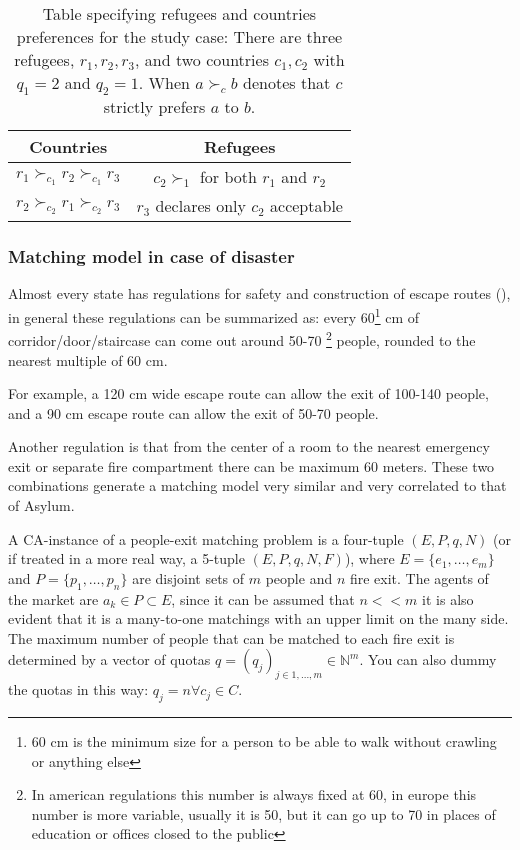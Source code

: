 \documentclass[letterpaper]{article} %
\begin{document}
\begin{table}[!htb]
    \begin{tabular}{c|c}
        \hline Countries & Refugees \\
        \hline\( r_{1} \succ_{c_{1}} r_{2} \succ_{c_{1}} r_{3} \) & \( c_{2} \succ_{1} \) for both \( r_{1} \) and \( r_{2} \) \\
        \( r_{2} \succ_{c_{2}} r_{1} \succ_{c_{2}} r_{3} \) & \( r_{3} \) declares only \( c_{2} \) acceptable \\
        \hline
    \end{tabular}
    \caption{Table specifying refugees and countries preferences for
    the study case: There are three refugees, \( r _ { 1 } , r _ { 2 } , r _ { 3 } \), and two countries \( c _ { 1 } , c _ { 2 } \) with \( q _ { 1 } = 2 \) and \( q _ { 2 } = 1 \).
    When \( a \succ_{c} b \) denotes that \( c \) strictly prefers \( a \) to \( b \).}
    \label{tab:countries-refugees}
\end{table}

\subsubsection{Matching model in case of disaster}

Almost every state has regulations for safety and construction of escape routes (\cite{it-81-2008,uk-1541-2005,usa-1910-1974,cee-654-1989,cee-567-1977}), in general these
regulations can be summarized as: every 60\footnote{60 cm is the minimum size for a person to be 
able to walk without crawling or anything else} cm of corridor/door/staircase can come out around 50-70
\footnote{In american regulations this number is always fixed at 60, in europe this number is more 
variable, usually it is 50, but it can go up to 70 in places of education or offices closed to the public} 
people, rounded to the nearest multiple of 60 cm.

For example, a 120 cm wide escape route can allow the exit of 100-140 people, and a 90 cm 
escape route can allow the exit of 50-70 people.

Another regulation is that from the center of a room to the nearest emergency exit or separate 
fire compartment there can be maximum 60 meters. These two combinations generate a matching model 
very similar and very correlated to that of Asylum.

A CA-instance of a people-exit matching problem is a four-tuple \((E, P, q, N)\)
(or if treated in a more real way, a 5-tuple \((E, P, q, N, F)\)), where
\(E = \{e_1, \dots, e_m\}\) and \(P = \{p_1, \dots,p_n\}\) are disjoint sets of \(m\) people and \(n\) fire exit.
The agents of the market  are \(a_k \in P\subset E\),
since it can be assumed that \(n << m\) it is also evident that it is a many-to-one matchings with an upper limit on the many side.
The maximum number of people that can be matched to
each fire exit is determined by a vector of quotas \(q = (q_j)_{j\in {1,...,m}} \in \mathbb{N}^m\).
You can also dummy the quotas in this way:  \(q_j = n \forall c_j \in C\).
\end{document}
